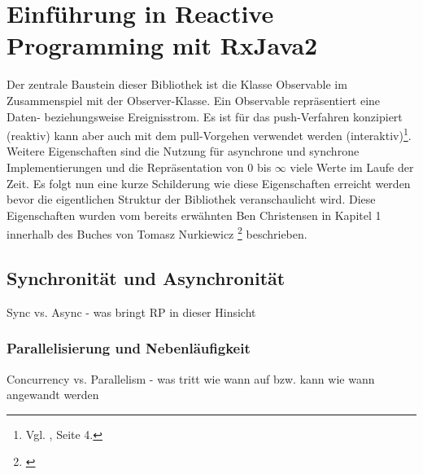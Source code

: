 \chapter{Einführung in Reactive Programming mit RxJava2}\label{rp_einfuehrung}
Der zentrale Baustein dieser Bibliothek ist die Klasse Observable im Zusammenspiel mit der Observer-Klasse. Ein Observable repräsentiert eine Daten- beziehungsweise Ereignisstrom. Es ist für das push-Verfahren konzipiert (reaktiv) kann aber auch mit dem pull-Vorgehen verwendet werden (interaktiv)\footnote{Vgl. \cite{Nurkiewicz.2017}, Seite 4.}. Weitere Eigenschaften sind die Nutzung für asynchrone und synchrone Implementierungen und die Repräsentation von 0 bis $\infty$ viele Werte im Laufe der Zeit. Es folgt nun eine kurze Schilderung wie diese Eigenschaften erreicht werden bevor die eigentlichen Struktur der Bibliothek veranschaulicht wird. Diese Eigenschaften wurden vom bereits erwähnten Ben Christensen in Kapitel 1 innerhalb des Buches von Tomasz Nurkiewicz \footnote{\cite{Nurkiewicz.2017}} beschrieben.
\section{Synchronität und Asynchronität}
Sync vs. Async - was bringt RP in dieser Hinsicht
\subsection{Parallelisierung und Nebenläufigkeit}
Concurrency vs. Parallelism - was tritt wie wann auf bzw. kann wie wann angewandt werden
